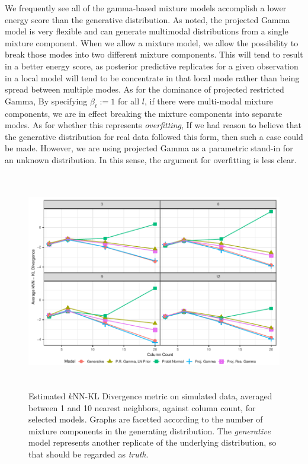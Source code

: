 We frequently see all of the gamma-based mixture models accomplish a lower energy score than the generative
  distribution.  As \cite{nunez2019} noted, the projected Gamma model is very flexible and can generate
  multimodal distributions from a single mixture component.  When we allow a mixture model, we allow
  the possibility to break those modes into two different mixture components.  This will tend to
  result in a better energy score, as posterior predictive replicates for a given observation in a local
  model will tend to be concentrate in that local mode rather than being spread between multiple
  modes.  As for the dominance of projected restricted Gamma, By specifying $\beta_{\ell} := 1$ for all
  $l$, if there were multi-modal mixture components, we are in effect breaking the mixture components
  into separate modes. As for whether this represents \emph{overfitting}, If we had reason to
  believe that the generative distribution for real data followed this form, then such a case could
  be made.  However, we are using projected Gamma as a parametric stand-in for an unknown distribution.
  In this sense, the argument for overfitting is less clear.

\begin{figure}[ht]
  \caption{Estimated $k$NN-KL Divergence metric on simulated data, averaged between 1 and 10 nearest
    neighbors, against column count, for selected models.  Graphs are facetted according to the
    number of mixture components in the generating distribution.  The \emph{generative} model
    represents another replicate of the underlying distribution, so that should be regarded as
    \emph{truth}.\label{fig:simkld}}
  \includegraphics[width = 5.5in, height = 3.75in]{./images/simulation_knn_kld}
\end{figure}

